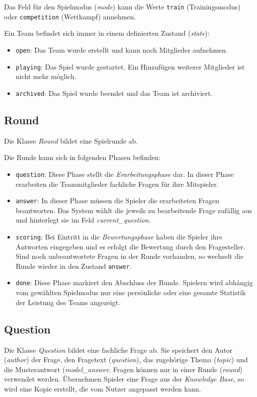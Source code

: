\documentclass[a4paper,11pt,listof=numbered,glossary=totoc,parskip=half,toc=bib]{scrreprt}
\begin{document}
	Das Feld für den Spielmodus (\textit{mode}) kann die Werte \texttt{train} (Trainingsmodus) oder \texttt{competition} (Wettkampf) annehmen.
	
	Ein Team befindet sich immer in einem definierten Zustand (\textit{state}):
	
	\begin{itemize}
		\item \texttt{open}: Das Team wurde erstellt und kann noch Mitglieder aufnehmen.
		\item \texttt{playing}: Das Spiel wurde gestartet. Ein Hinzufügen weiterer Mitglieder ist nicht mehr möglich.
		\item \texttt{archived}: Das Spiel wurde beendet und das Team ist archiviert.
	\end{itemize}
	
	\subsection{Round}
	Die Klasse \textit{Round} bildet eine Spielrunde ab. 
	
	Die Runde kann sich in folgenden Phasen befinden: 
	
	\begin{itemize}
		\item \texttt{question}: Diese Phase stellt die \textit{Erarbeitungsphase} dar. In dieser Phase erarbeiten die Teammitglieder fachliche Fragen für ihre Mitspieler. 
		\item \texttt{answer}: In dieser Phase müssen die Spieler die erarbeiteten Fragen beantworten. Das System wählt die jeweils zu bearbeitende Frage zufällig aus und hinterlegt sie im Feld \textit{current\_{}question}.
		\item \texttt{scoring}: Bei Eintritt in die \textit{Bewertungsphase} haben die Spieler ihre Antworten eingegeben und es erfolgt die Bewertung durch den Fragesteller. Sind noch unbeantwortete Fragen in der Runde vorhanden, so wechselt die Runde wieder in den Zustand \texttt{answer}.
		
		\item \texttt{done}: Diese Phase markiert den Abschluss der Runde. Spielern wird abhängig vom gewählten Spielmodus nur eine persönliche oder eine gesamte Statistik der Leistung des Teams angezeigt. 
	\end{itemize}
	
	\subsection{Question}
	Die Klasse \textit{Question} bildet eine fachliche Frage ab. Sie speichert den Autor (\textit{author}) der Frage, den Fragetext (\textit{question}), das zugehörige Thema (\textit{topic}) und die Musterantwort (\textit{model\_{}answer}. Fragen können nur in einer Runde (\textit{round}) verwendet werden. Übernehmen Spieler eine Frage aus der \textit{Knowledge Base}, so wird eine Kopie erstellt, die vom Nutzer angepasst werden kann.
	
\end{document}
